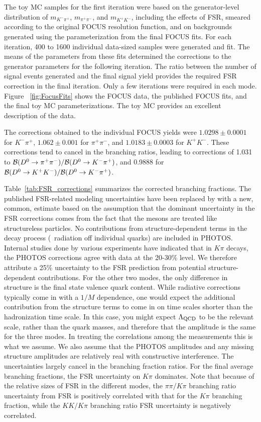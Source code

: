 The toy MC samples for the first iteration were based on the generator-level 
distribution of $m_{K^-\pi^+}$, $m_{\pi^+\pi^-}$, and $m_{K^+K^-}$, including 
the effects of FSR, smeared according to the original FOCUS resolution 
function,  and on backgrounds 
generated 
using the parameterization from the final
FOCUS fits.  For each iteration, 400 to 1600 individual 
data-sized samples were 
generated 
and fit. The means of the parameters from these fits determined the 
corrections to the generator parameters for the following iteration.  The 
ratio between the number of signal events generated and the final signal 
yield provides the required FSR correction in the final iteration.  Only a 
few iterations were required in each mode.  Figure ~\ref{fig:FocusFits} 
shows the FOCUS data, the published FOCUS fits, and the final toy MC 
parameterizations.  The toy MC provides an excellent description of the 
data.

The corrections obtained to the individual FOCUS yields were 
$1.0298\pm 0.0001$ for $K^-\pi^+$, $1.062 \pm 0.001$ for $\pi^+\pi^-$, 
and $1.0183 \pm 0.0003$ for $K^+K^-$.  These corrections tend to cancel 
in the branching ratios, leading to corrections of 1.031 to  
${\cal B}(D^0\to \pi^+\pi^-)/{\cal B}(D^0\to K^-\pi^+)$, and 0.9888 for 
${\cal B}(D^0\to K^+ K^-)/{\cal B}(D^0\to K^-\pi^+)$.

Table~\ref{tab:FSR_corrections} summarizes the corrected branching fractions. 
The published FSR-related modeling uncertainties have been replaced by with a
new, common, estimate based on the assumption that the dominant uncertainty 
in the FSR corrections comes from the fact that the mesons are treated like 
structureless particles. No contributions from structure-dependent terms in 
the decay process (\eg\ radiation off individual quarks) are included in PHOTOS. 
Internal studies done by various experiments have indicated that 
in $K\pi$ decays, 
the PHOTOS corrections agree with data at the 20-30\% level. 
We therefore attribute a 25\% uncertainty to the FSR prediction from potential 
structure-dependent contributions. For the other two modes, the only difference 
in structure is the final state valence quark content. While radiative corrections 
typically come in with a $1/M$ dependence, one would expect the additional 
contribution from the structure terms to come in on time scales shorter than 
the hadronization time scale. In this case, you might expect
$\rm \Lambda_{\rm QCD}$ to be the relevant scale, rather than the quark masses,
and therefore that the amplitude is the same for the three modes. In treating
the correlations among the measurements this is what we assume. We also assume
that the PHOTOS amplitudes and any missing structure amplitudes are relatively 
real with constructive interference.  The uncertainties largely cancel 
in the branching fraction ratios. For the final average branching 
fractions, the FSR uncertainty on $K\pi$ dominates. Note that because 
of the relative sizes of FSR in the different modes, the $\pi\pi/K\pi$ 
branching ratio uncertainty from FSR is 
positively correlated with that 
for the $K\pi$ branching fraction, while the $KK/K\pi$ branching ratio FSR
uncertainty is negatively correlated.

